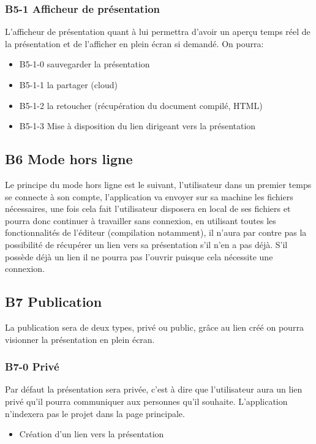 \documentclass[11pt,a4paper]{article}
\begin{document}
\subsubsection{B5-1 Afficheur de présentation}
L'afficheur de présentation quant à lui permettra d'avoir un aperçu temps réel de la présentation et de l'afficher en plein écran si demandé. On pourra:
\begin{itemize}
\item B5-1-0 sauvegarder la présentation
\item B5-1-1 la partager (cloud)
\item B5-1-2 la retoucher (récupération du document compilé, HTML)
\item B5-1-3 Mise à disposition du lien dirigeant vers la présentation
\end{itemize} 

\subsection{B6 Mode hors ligne}
Le principe du mode hors ligne est le suivant, l'utilisateur dans un premier temps se connecte à son compte, l'application va envoyer sur sa machine les fichiers nécessaires, une fois cela fait l'utilisateur disposera en local de ses fichiers et pourra donc continuer à travailler sans connexion, en utilisant toutes les fonctionnalités de l'éditeur (compilation notamment), il n'aura par contre pas la possibilité de récupérer un lien vers sa présentation s'il n'en a pas déjà. S'il possède déjà un lien il ne pourra pas l'ouvrir puisque cela nécessite une connexion.

\subsection{B7 Publication}
La publication sera de deux types, privé ou public, grâce au lien créé on pourra visionner la présentation en plein écran.

\subsubsection{B7-0 Privé}
Par défaut la présentation sera privée, c'est à dire que l'utilisateur aura un lien privé qu'il pourra communiquer aux personnes qu'il souhaite. L'application n'indexera pas le projet dans la page principale.
\begin{itemize}
\item Création d'un lien vers la présentation
\end{itemize}
\end{document}
